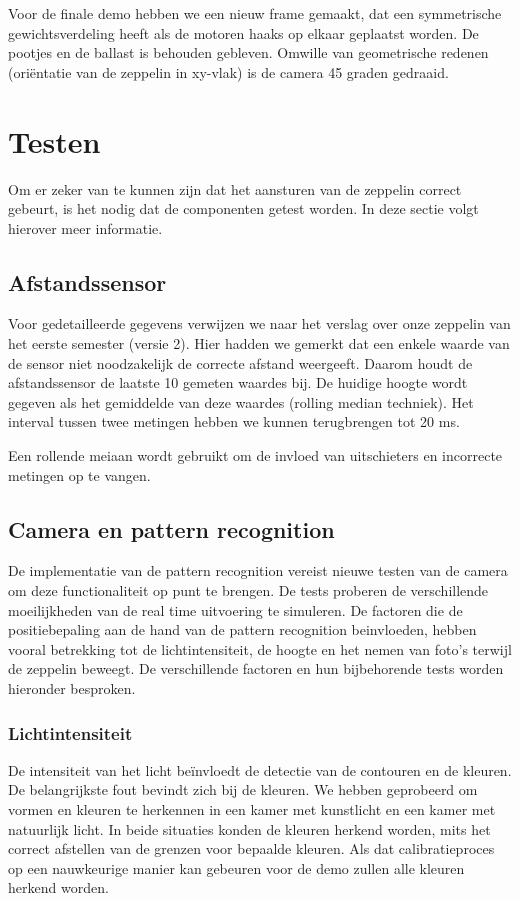 \documentclass[eind]{penoverslag}
\begin{document}
Voor de finale demo hebben we een nieuw frame gemaakt, dat een symmetrische gewichtsverdeling heeft als de motoren haaks op elkaar geplaatst worden. De pootjes en de ballast is behouden gebleven. Omwille van geometrische redenen (ori\"entatie van de zeppelin in xy-vlak) is de camera 45 graden gedraaid. \\

\section{Testen}

Om er zeker van te kunnen zijn dat het aansturen van de zeppelin correct gebeurt, is het nodig dat de componenten getest worden. In deze sectie volgt hierover meer informatie.

\subsection{Afstandssensor}
Voor gedetailleerde gegevens verwijzen we naar het verslag over onze zeppelin van het eerste semester (versie 2). Hier hadden we gemerkt dat een enkele waarde van de sensor niet noodzakelijk de correcte afstand weergeeft. Daarom houdt de afstandssensor de laatste 10 gemeten waardes bij. De huidige hoogte wordt gegeven als het gemiddelde van deze waardes (rolling median techniek). Het interval tussen twee metingen hebben we kunnen terugbrengen tot 20 ms.

Een rollende meiaan wordt gebruikt om de invloed van uitschieters en incorrecte metingen op te vangen. \\

\subsection{Camera en pattern recognition}
De implementatie van de pattern recognition vereist nieuwe testen van de camera om deze functionaliteit op punt te brengen. De tests proberen de verschillende moeilijkheden van de real time uitvoering te simuleren. De factoren die de positiebepaling aan de hand van de pattern recognition beinvloeden, hebben vooral betrekking tot de lichtintensiteit, de hoogte en het nemen van foto’s terwijl de zeppelin beweegt. De verschillende factoren en hun bijbehorende tests worden hieronder besproken.

\subsubsection{Lichtintensiteit}
De intensiteit van het licht be\"{i}nvloedt de detectie van de contouren en de kleuren. De belangrijkste fout bevindt zich bij de kleuren. We hebben geprobeerd om vormen en kleuren te herkennen in een kamer met kunstlicht en een kamer met natuurlijk licht. In beide situaties konden de kleuren herkend worden, mits het correct afstellen van de grenzen voor bepaalde kleuren. Als dat calibratieproces op een nauwkeurige manier kan gebeuren voor de demo zullen alle kleuren herkend worden.
\end{document}
